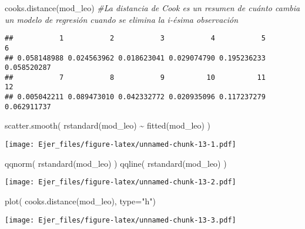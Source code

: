 \documentclass[
]{article}
\newenvironment{Shaded}{\begin{snugshade}}{\end{snugshade}}
\newcommand{\AttributeTok}[1]{\textcolor[rgb]{0.77,0.63,0.00}{#1}}
\newcommand{\CommentTok}[1]{\textcolor[rgb]{0.56,0.35,0.01}{\textit{#1}}}
\newcommand{\FunctionTok}[1]{\textcolor[rgb]{0.00,0.00,0.00}{#1}}
\newcommand{\NormalTok}[1]{#1}
\newcommand{\SpecialCharTok}[1]{\textcolor[rgb]{0.00,0.00,0.00}{#1}}
\newcommand{\StringTok}[1]{\textcolor[rgb]{0.31,0.60,0.02}{#1}}
\begin{document}
\begin{Shaded}
\begin{Highlighting}[]
\FunctionTok{cooks.distance}\NormalTok{(mod\_leo) }\CommentTok{\#La distancia de Cook es un resumen de cuánto cambia un modelo de regresión cuando se elimina la i{-}ésima observación}
\end{Highlighting}
\end{Shaded}

\begin{verbatim}
##           1           2           3           4           5           6 
## 0.058148988 0.024563962 0.018623041 0.029074790 0.195236233 0.058520287 
##           7           8           9          10          11          12 
## 0.005042211 0.089473010 0.042332772 0.020935096 0.117237279 0.062911737
\end{verbatim}

\begin{Shaded}
\begin{Highlighting}[]
 \FunctionTok{scatter.smooth}\NormalTok{( }\FunctionTok{rstandard}\NormalTok{(mod\_leo) }\SpecialCharTok{\textasciitilde{}} \FunctionTok{fitted}\NormalTok{(mod\_leo) )}
\end{Highlighting}
\end{Shaded}

\texttt{[image: Ejer\_files/figure-latex/unnamed-chunk-13-1.pdf]}

\begin{Shaded}
\begin{Highlighting}[]
 \FunctionTok{qqnorm}\NormalTok{( }\FunctionTok{rstandard}\NormalTok{(mod\_leo) )}
 \FunctionTok{qqline}\NormalTok{( }\FunctionTok{rstandard}\NormalTok{(mod\_leo) )}
\end{Highlighting}
\end{Shaded}

\texttt{[image: Ejer\_files/figure-latex/unnamed-chunk-13-2.pdf]}

\begin{Shaded}
\begin{Highlighting}[]
 \FunctionTok{plot}\NormalTok{( }\FunctionTok{cooks.distance}\NormalTok{(mod\_leo), }\AttributeTok{type=}\StringTok{"h"}\NormalTok{)}
\end{Highlighting}
\end{Shaded}

\texttt{[image: Ejer\_files/figure-latex/unnamed-chunk-13-3.pdf]}

\begin{Shaded}
\end{Shaded}
\end{document}
